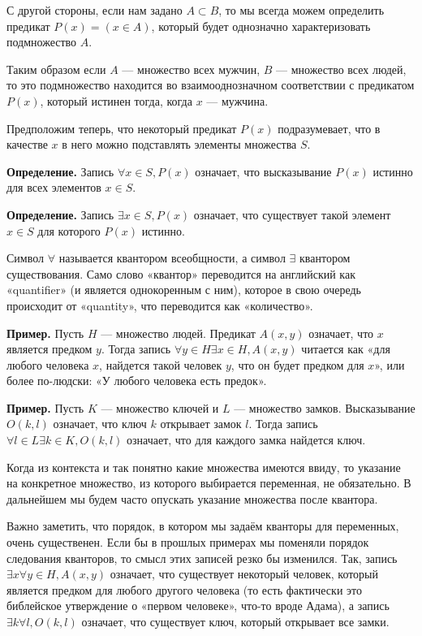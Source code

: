 С другой стороны, если нам задано $A \subset B$, то мы всегда можем определить предикат $P(x) = (x\in A)$, который будет однозначно характеризовать подмножество $A$.

Таким образом если $A$ — множество всех мужчин, $B$ — множество всех людей, то это подмножество находится во взаимооднозначном соответствии с предикатом $P(x)$, который истинен тогда, когда $x$ — мужчина.

Предположим теперь, что некоторый предикат $P(x)$ подразумевает, что в качестве $x$ в него можно подставлять элементы множества $S$.

{\bfseries Определение.} Запись $\forall x\in S, P(x)$ означает, что высказывание $P(x)$ истинно для всех элементов $x \in S$.

{\bfseries Определение.} Запись $\exists x\in S, P(x)$ означает, что существует такой элемент $x\in S$ для которого $P(x)$ истинно.

Символ $\forall$ называется квантором всеобщности, а символ $\exists$ квантором существования.  Само слово «квантор» переводится на английский как «quantifier» (и является однокоренным с ним), которое в свою очередь происходит от «quantity», что переводится как «количество».

{\bfseries Пример.} Пусть $H$ — множество людей. Предикат $A(x, y)$ означает, что $x$ является предком $y$. Тогда запись $\forall y\in H \exists x \in H, A(x, y)$ читается как «для любого человека $x$, найдется такой человек $y$, что он будет предком для $x$», или более по-людски: «У любого человека есть предок».

{\bfseries Пример.} Пусть $K$ — множество ключей и $L$ — множество замков. Высказывание $O(k, l)$ означает, что ключ $k$ открывает замок $l$. Тогда запись $\forall l\in L \exists k \in K, O(k, l)$ означает, что для каждого замка найдется ключ.

Когда из контекста и так понятно какие множества имеются ввиду, то указание на конкретное множество, из которого выбирается переменная, не обязательно. В дальнейшем мы будем часто опускать указание множества после квантора.

Важно заметить, что порядок, в котором мы задаём кванторы для переменных, очень существенен. Если бы в прошлых примерах мы поменяли порядок следования кванторов, то смысл этих записей резко бы изменился. Так, запись $\exists x \forall y \in H, A(x, y)$ означает, что существует некоторый человек, который является предком для любого другого человека (то есть фактически это библейское утверждение о «первом человеке», что-то вроде Адама), а запись $\exists k \forall l, O(k, l)$ означает, что существует ключ, который открывает все замки.

